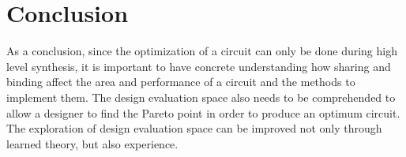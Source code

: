 \section{Conclusion}


As a conclusion, since the optimization of a circuit can only be done during  high level synthesis, it is important to have concrete understanding how sharing and binding affect the area and performance of a circuit and the methods to implement them. The design evaluation space also needs to be comprehended to allow a designer to find the Pareto point in order to produce an optimum circuit.  The exploration of design evaluation space can be improved not only through learned theory, but also experience.